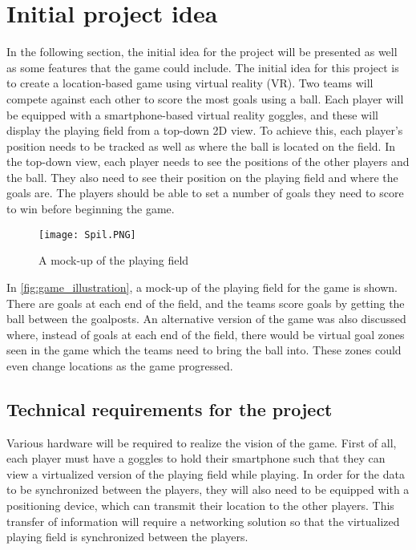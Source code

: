 \section{Initial project idea}\label{sec:projectidea}
In the following section, the initial idea for the project will be presented as well as some features that the game could include.
The initial idea for this project is to create a location-based game using virtual reality (VR).
Two teams will compete against each other to score the most goals using a ball. 
Each player will be equipped with a smartphone-based virtual reality goggles, and these will display the playing field from a top-down 2D view. 
To achieve this, each player's position needs to be tracked as well as where the ball is located on the field.
In the top-down view, each player needs to see the positions of the other players and the ball.
They also need to see their position on the playing field and where the goals are.
The players should be able to set a number of goals they need to score to win before beginning the game. 
\begin{figure}[H]
    \centering
    \texttt{[image: Spil.PNG]}
    \caption{A mock-up of the playing field}
    \label{fig:game_illustration}
\end{figure}
\noindent
In \autoref{fig:game_illustration}, a mock-up of the playing field for the game is shown.
There are goals at each end of the field, and the teams score goals by getting the ball between the goalposts.
An alternative version of the game was also discussed where, instead of goals at each end of the field, there would be virtual goal zones seen in the game which the teams need to bring the ball into.
These zones could even change locations as the game progressed.

\subsection{Technical requirements for the project}
Various hardware will be required to realize the vision of the game.
First of all, each player must have a goggles to hold their smartphone such that they can view a virtualized version of the playing field while playing.
In order for the data to be synchronized between the players, they will also need to be equipped with a positioning device, which can transmit their location to the other players.
This transfer of information will require a networking solution so that the virtualized playing field is synchronized between the players.

